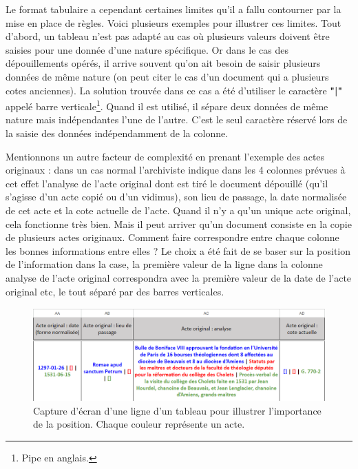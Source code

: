 \par
Le format tabulaire a cependant certaines limites qu'il a fallu contourner par la mise en place de règles. Voici plusieurs exemples pour illustrer ces limites. Tout d'abord, un tableau n'est pas adapté au cas où plusieurs valeurs doivent être saisies pour une donnée d'une nature spécifique. Or dans le cas des dépouillements opérés, il arrive souvent qu'on ait besoin de saisir plusieurs données de même nature (on peut citer le cas d'un document qui a plusieurs cotes anciennes). La solution trouvée dans ce cas a été d'utiliser le caractère \textbf{"|"} appelé barre verticale\footnote{Pipe en anglais.}. Quand il est utilisé, il sépare deux données de même nature mais indépendantes l'une de l'autre. C'est le seul caractère réservé lors de la saisie des données indépendamment de la colonne. 
\par
Mentionnons un autre facteur de complexité en prenant l'exemple des actes originaux : dans un cas normal l'archiviste indique dans les 4 colonnes prévues à cet effet l'analyse de l'acte original dont est tiré le document dépouillé (qu'il s'agisse d'un acte copié ou d'un vidimus), son lieu de passage, la date normalisée de cet acte et la cote actuelle de l'acte. Quand il n'y a qu'un unique acte original, cela fonctionne très bien. Mais il peut arriver qu'un document consiste en la copie de plusieurs actes originaux. Comment faire correspondre entre chaque colonne les bonnes informations entre elles ? Le choix a été fait de se baser sur la position de l'information dans la case, la première valeur de la ligne dans la colonne analyse de l'acte original correspondra avec la première valeur de la date de l'acte original etc, le tout séparé par des barres verticales.
\par
\begin{figure}[!h]
    \centering
    \includegraphics[width=1\linewidth]{images/tableau-positions-originaux.png}
    \caption{Capture d'écran d'une ligne d'un tableau pour illustrer l'importance de la position. Chaque couleur représente un acte.}
    \label{fig:position-tableau-couleur}
\end{figure}
